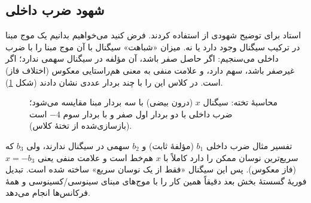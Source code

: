 \subsection{شهود ضرب داخلی}
استاد برای توضیح شهودی از  استفاده کردند. فرض کنید می‌خواهیم بدانیم یک موج مبنا در ترکیب سیگنال وجود دارد یا نه. میزان «شباهت» سیگنال با آن موج مبنا را با ضرب داخلی می‌سنجیم: اگر حاصل صفر باشد، آن مؤلفه در سیگنال سهمی ندارد؛ اگر غیرصفر باشد، سهم دارد، و علامت منفی به معنی هم‌راستایی معکوس (اختلاف فاز) است. در کلاس این را با چند بردار عددی نشان دادند (شکل \ref{fig:ch03-dot-example}).

\begin{figure}[htbp]
\centering
{}
\caption{محاسبهٔ تخته: سیگنال $x$ (درون بیضی) با سه بردار مبنا مقایسه می‌شود؛ ضرب داخلی با دو بردار اول صفر و با بردار سوم $-4$ است (بازسازی‌شده از تختهٔ کلاس).}
\label{fig:ch03-dot-example}
\end{figure}

\begin{addedbox}{تفسیر مثال ضرب داخلی}
$b_1$ (مؤلفهٔ ثابت) و $b_2$ سهمی در سیگنال ندارند، ولی $b_3$ که سریع‌ترین نوسان ممکن را دارد کاملاً با $x$ هم‌خط است و علامت منفی یعنی $x=-b_3$ (فاز معکوس). پس این سیگنال «فقط از یک نوسان سریع» ساخته شده است. تبدیل فوریهٔ گسستهٔ بخش بعد دقیقاً همین کار را با موج‌های مبنای سینوسی/کسینوسی و همهٔ فرکانس‌ها انجام می‌دهد.
\end{addedbox}


